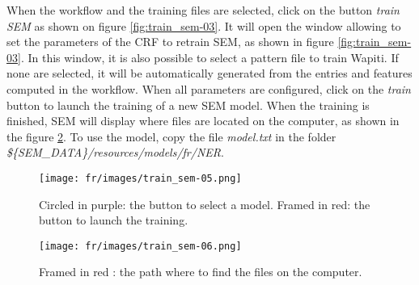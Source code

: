 \documentclass[manual-fr.tex]{subfiles}
\begin{document}
When the workflow and the training files are selected, click on the button \emph{train SEM} as shown on figure \ref{fig:train_sem-03}. It will open the window allowing to set the parameters of the CRF to retrain SEM, as shown in figure \ref{fig:train_sem-03}. In this window, it is also possible to select a pattern file to train Wapiti. If none are selected, it will be automatically generated from the entries and features computed in the workflow. When all parameters are configured, click on the \emph{train} button to launch the training of a new SEM model. When the training is finished, SEM will display where files are located on the computer, as shown in the figure \ref{fig:train_sem-06}. To use the model, copy the file \emph{model.txt} in the folder \emph{\$\{SEM\_DATA\}/resources/models/fr/NER}.

\begin{figure}[ht!]
    \begin{center}
    \texttt{[image: fr/images/train\_sem-05.png]}
    \end{center}
    \caption{Circled in purple: the button to select a model. Framed in red: the button to launch the training.}
    \label{fig:train_sem-05}
\end{figure}

\begin{figure}[ht!]
    \begin{center}
    \texttt{[image: fr/images/train\_sem-06.png]}
    \end{center}
    \caption{Framed in red : the path where to find the files on the computer.}
    \label{fig:train_sem-06}
\end{figure}
\end{document}
